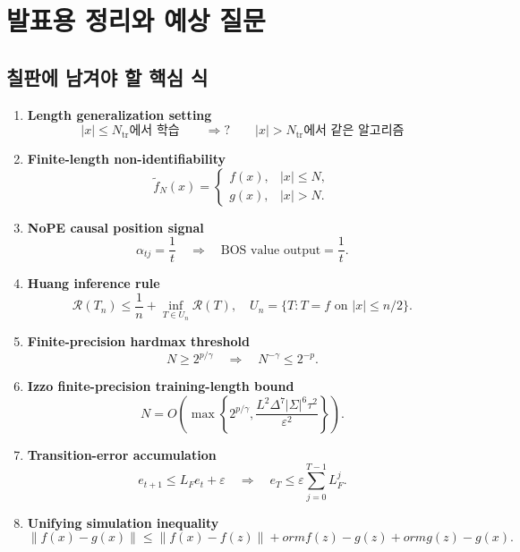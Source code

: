 \documentclass[11pt,a4paper,oneside,openany]{memoir}
\newcommand{\Risk}{\mathcal{R}}
\newcommand{\norm}[1]{\left\lVert #1\right\rVert}
\theoremstyle{definition}
\begin{document}
\chapter{발표용 정리와 예상 질문}

\section{칠판에 남겨야 할 핵심 식}

\begin{enumerate}
\item \textbf{Length generalization setting}
\[
|x|\le N_{\mathrm{tr}}\text{에서 학습}
\qquad\Longrightarrow?\qquad
|x|>N_{\mathrm{tr}}\text{에서 같은 알고리즘}
\]

\item \textbf{Finite-length non-identifiability}
\[
\widetilde f_N(x)=
\begin{cases}
f(x),&|x|\le N,\\
g(x),&|x|>N.
\end{cases}
\]

\item \textbf{NoPE causal position signal}
\[
\alpha_{tj}=\frac1t
\quad\Longrightarrow\quad
\text{BOS value output}=\frac1t.
\]

\item \textbf{Huang inference rule}
\[
\Risk(T_n)\le\frac1n+\inf_{T\in U_n}\Risk(T),
\quad
U_n=\{T:T=f\text{ on }|x|\le n/2\}.
\]

\item \textbf{Finite-precision hardmax threshold}
\[
N\ge 2^{p/\gamma}
\quad\Longrightarrow\quad
N^{-\gamma}\le2^{-p}.
\]

\item \textbf{Izzo finite-precision training-length bound}
\[
N=O\!\left(
\max\left\{2^{p/\gamma},
\frac{L^2\Delta^7|\Sigma|^6\tau^2}{\varepsilon^2}
\right\}\right).
\]

\item \textbf{Transition-error accumulation}
\[
e_{t+1}\le L_Fe_t+\varepsilon
\quad\Longrightarrow\quad
 e_T\le\varepsilon\sum_{j=0}^{T-1}L_F^j.
\]

\item \textbf{Unifying simulation inequality}
\[
\norm{f(x)-g(x)}
\le
\norm{f(x)-f(z)}+
orm{f(z)-g(z)}+
orm{g(z)-g(x)}.
\]
\end{enumerate}
\end{document}
